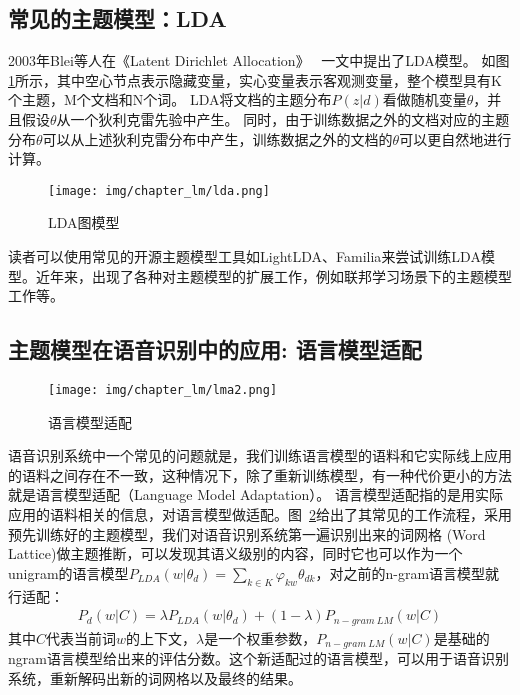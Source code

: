 \subsection{常见的主题模型：LDA}

2003年Blei等人在《Latent Dirichlet Allocation》~\cite{blei2003latent} 一文中提出了LDA模型。
如图\ref{pic:lda}所示，其中空心节点表示隐藏变量，实心变量表示客观测变量，整个模型具有K个主题，M个文档和N个词。
LDA将文档的主题分布$P(z|d)$看做随机变量$\theta$，并且假设$\theta$从一个狄利克雷先验中产生。
同时，由于训练数据之外的文档对应的主题分布$\theta$可以从上述狄利克雷分布中产生，训练数据之外的文档的$\theta$可以更自然地进行计算。

\begin{figure}[htb]
	\begin{center}
		\texttt{[image: img/chapter\_lm/lda.png]}
		\caption{LDA图模型}
		\label{pic:lda}
	\end{center}
\end{figure}

读者可以使用常见的开源主题模型工具如LightLDA\cite{yuan2015lightlda}、Familia\cite{jiang2018familia}来尝试训练LDA模型。近年来，出现了各种对主题模型的扩展工作，例如联邦学习场景下的主题模型\cite{jiang2019federated}工作等。

\subsection{主题模型在语音识别中的应用: 语言模型适配}

\begin{figure}[htb]
	\begin{center}
		\texttt{[image: img/chapter\_lm/lma2.png]}
		\caption{语言模型适配}
		\label{pic:lma}
	\end{center}
\end{figure}

语音识别系统中一个常见的问题就是，我们训练语言模型的语料和它实际线上应用的语料之间存在不一致，这种情况下，除了重新训练模型，有一种代价更小的方法就是语言模型适配（Language Model Adaptation）。
语言模型适配指的是用实际应用的语料相关的信息，对语言模型做适配。图~\ref{pic:lma}给出了其常见的工作流程，采用预先训练好的主题模型，我们对语音识别系统第一遍识别出来的词网格
(Word Lattice)做主题推断，可以发现其语义级别的内容，同时它也可以作为一个unigram的语言模型$P_{LDA}(w|\theta_d)=\sum_{k \in K} \varphi_{kw} \theta_{dk}$，对之前的n-gram语言模型就行适配：
\begin{equation}
\begin{aligned}
P_{d}(w|C) = \lambda P_{LDA}(w|\theta_d) + (1-\lambda) P_{n-gram \ LM}(w|C)
\end{aligned}
\label{eq:hb_model}
\end{equation}
其中$C$代表当前词$w$的上下文，$\lambda$是一个权重参数，$P_{n-gram\ LM}(w|C)$是基础的ngram语言模型给出来的评估分数。这个新适配过的语言模型，可以用于语音识别系统，重新解码出新的词网格以及最终的结果。
